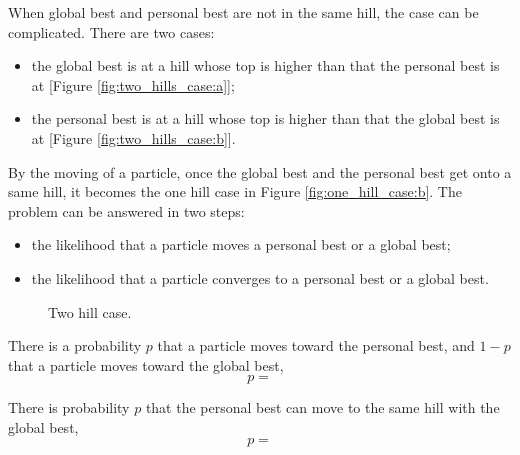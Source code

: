 When global best and personal best are not in the same hill, the case can be complicated.
There are two cases:
\begin{itemize}
\item the global best is at a hill whose top is higher than that the personal best is at [Figure \ref{fig:two_hills_case:a}];
\item the personal best is at a hill whose top is higher than that the global best is at [Figure \ref{fig:two_hills_case:b}]. 
\end{itemize}
By the moving of a particle, once the global best and the personal best get onto a same hill, it becomes the one hill case in Figure \ref{fig:one_hill_case:b}.
The problem can be answered in two steps:
\begin{itemize}
\item the likelihood that a particle moves a personal best or a global best;
\item the likelihood that a particle converges to a personal best or a global best.
\end{itemize}

\begin{figure}
\centering
{}
\caption{Two hill case.}
\label{fig:two_hills_case}
\end{figure}


\begin{theorem}
There is a probability $ p $  that a particle moves toward the personal best, and $ 1 - p $ that a particle moves toward the global best,
\begin{equation}
p = 
\end{equation}
\end{theorem}

\begin{corollary}
There is probability $ p $ that the personal best can move to the same hill with the global best,
\begin{equation}
p = 
\end{equation}
\end{corollary}
